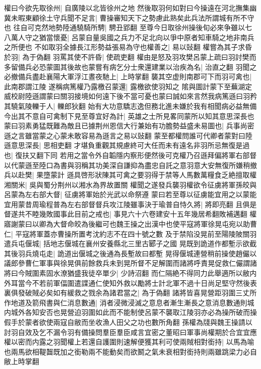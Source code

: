 權曰今欲先取徐州|{
	自廣陵以北皆徐州之地}
然後取羽何如對曰今操遠在河北撫集幽冀未暇東顧徐土守兵聞不足言|{
	曹操審知天下之勢慮此熟矣此兵法所謂城有所不守也}
往自可克然地勢陸通驍騎所騁|{
	騁丑郢翻}
至尊今日取徐州操後旬必來争雖以七八萬人守之猶當懷憂|{
	呂蒙自量吳國之兵力不足北向以爭中原者知車騎之地非南兵之所便也}
不如取羽全據長江形勢益張易為守也權善之|{
	易以䜴翻}
權嘗為其子求昏於羽|{
	為于偽翻}
羽罵其使不許昏|{
	使疏吏翻}
權由是怒及羽攻樊呂蒙上疏曰羽討樊而多留備兵必恐蒙圖其後故也蒙嘗有病乞分士衆還建業以治疾為名|{
	治直之翻}
羽聞之必撤備兵盡赴襄陽大軍浮江晝夜馳上|{
	上時掌翻}
襲其空虚則南郡可下而羽可禽也|{
	此南郡謂江陵}
遂稱病篤權乃露檄召蒙還|{
	露檄欲使羽知之}
隂與圖計蒙下至蕪湖定威校尉陸遜謂蒙曰關羽接境如何遠下後不當可憂也蒙曰誠如來言然我病篤遜曰羽矜其驍氣陵轢于人|{
	轢郎狄翻}
始有大功意驕志逸但務北進未嫌於我有相聞病必益無備今出其不意自可禽制下見至尊宜好為計|{
	英雄之士所見畧同蒙所以知其意思深長也}
蒙曰羽素勇猛既難為敵且已據荆州恩信大行兼始有功膽勢益盛未易圖也|{
	兵事尚密遜之言雖當蒙之心蒙未敢容易為遜言之易以䜴翻}
蒙至都權問誰可代卿者蒙對曰陸遜意思深長|{
	思相吏翻}
才堪負重觀其規慮終可大任而未有遠名非羽所忌無復是過也|{
	復扶又翻下同}
若用之當令外自韜隱内察形便然後可克權乃召遜拜偏將軍右部督以代蒙遜至陸口為書與羽稱其功美深自謙抑為盡忠自託之意羽意大安無復所嫌稍撤兵以赴樊|{
	果墮蒙計}
遜具啓形狀陳其可禽之要羽得于禁等人馬數萬糧食乏絶擅取權湘關米|{
	吳與蜀分荆州以湘水為界故置關}
權聞之遂發兵襲羽權欲令征虜將軍孫皎與呂蒙為左右部大督|{
	征虜將軍始於光武以命祭遵}
蒙曰若至尊以征虜能宜用之以蒙能宜用蒙昔周瑜程普為左右部督督兵攻江陵雖事決于瑜普自恃久將|{
	將即亮翻}
且俱是督遂共不睦幾敗國事此目前之戒也|{
	事見六十六卷建安十五年幾居希翻敗補邁翻}
權寤謝蒙曰以卿為大督命皎為後繼可也魏王操之出漢中也使平寇將軍徐晃屯宛以助曹仁|{
	平寇將軍蓋亦曹操所置考沈約志不在四十號之數}
及于禁陷没晃前至陽陵陂關羽遣兵屯偃城|{
	括地志偃城在襄州安養縣北三里古郾子之國}
晃既到詭道作都塹示欲截其後羽兵燒屯走|{
	詭道出偃城之後通為長塹故曰都塹}
晃得偃城連營稍前操使趙儼以議郎參曹仁軍事與徐晃俱前餘救兵未到晃所督不足解圍而諸將呼責晃促救仁儼謂諸將曰今賊圍素固水潦猶盛我徒卒單少|{
	少詩沼翻}
而仁隔絶不得同力此舉適所以敝内外耳當今不若前軍偪圍遣諜通仁使知外救以勵將士計北軍不過十日尚足堅守然後表裏俱發破賊必矣如有緩救之戮余為諸君當之|{
	為于偽翻}
諸將皆喜晃營距羽圍三丈所作地道及箭飛書與仁消息數通|{
	消者浸微浸滅之意息者漸生漸長之意消息數通則城内城外各知安否也晃營迫羽圍如此而不能制使呂蒙不襲取江陵羽亦必為操所破而操假手於蒙者欲使兩寇自敝而坐收漁人田父之功也數所角翻}
孫權為牋與魏王操請以討羽自效及乞不漏令羽有備操問羣臣羣臣咸言宜密之董昭曰軍事尚權期於合宜宜應權以密而内露之羽聞權上若還自護圍則速解便獲其利可使兩賊相對銜持|{
	以馬為喻也兩馬欲相鞮齧既加之銜勒兩不能動矣而欲鬭之氣未衰相對銜持則兩雖跳梁力必自敝上時掌翻}
